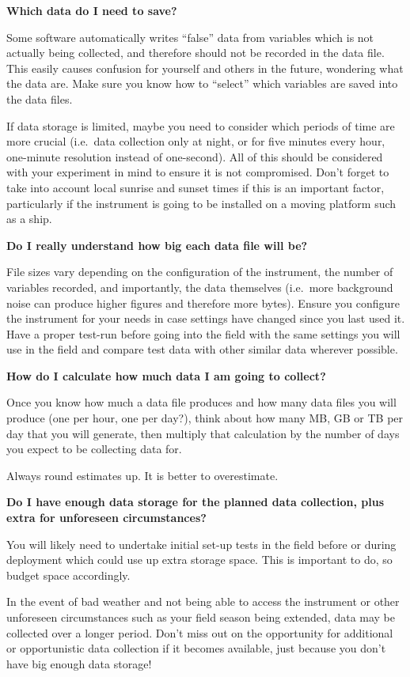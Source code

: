\documentclass[a4paper,oneside]{report}
\begin{document}
\textbf{Which data do I need to save?}

Some software automatically writes ``false'' data from variables which
is not actually being collected, and therefore should not be recorded in
the data file. This easily causes confusion for yourself and others in
the future, wondering what the data are. Make sure you know how to
``select'' which variables are saved into the data files.

If data storage is limited, maybe you need to consider which periods of
time are more crucial (i.e.~data collection only at night, or for five
minutes every hour, one-minute resolution instead of one-second). All of
this should be considered with your experiment in mind to ensure it is
not compromised. Don't forget to take into account local sunrise and
sunset times if this is an important factor, particularly if the
instrument is going to be installed on a moving platform such as a ship.

\textbf{Do I really understand how big each data file will be?}

File sizes vary depending on the configuration of the instrument, the
number of variables recorded, and importantly, the data themselves
(i.e.~more background noise can produce higher figures and therefore
more bytes). Ensure you configure the instrument for your needs in case
settings have changed since you last used it. Have a proper test-run
before going into the field with the same settings you will use in the
field and compare test data with other similar data wherever possible.

\textbf{How do I calculate how much data I am going to collect?}

Once you know how much a data file produces and how many data files you
will produce (one per hour, one per day?), think about how many MB, GB
or TB per day that you will generate, then multiply that calculation by
the number of days you expect to be collecting data for.

Always round estimates up. It is better to overestimate.

\textbf{Do I have enough data storage for the planned data collection,
plus extra for unforeseen circumstances?}

You will likely need to undertake initial set-up tests in the field
before or during deployment which could use up extra storage space. This
is important to do, so budget space accordingly.

In the event of bad weather and not being able to access the instrument
or other unforeseen circumstances such as your field season being
extended, data may be collected over a longer period. Don't miss out on
the opportunity for additional or opportunistic data collection if it
becomes available, just because you don't have big enough data storage!
\end{document}
